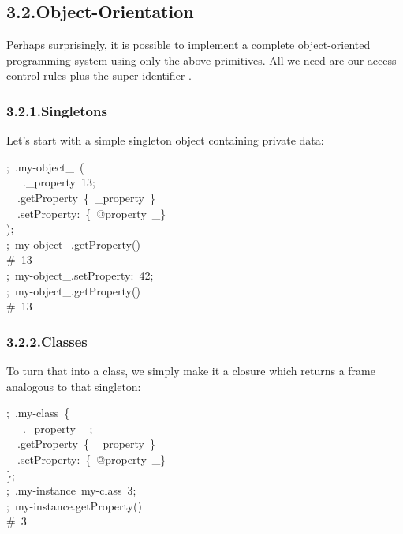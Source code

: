 \documentclass[preprint]{{acmart}}
\begin{document}
\subsection{3.2.\hspace*{0.5em}Object-Orientation}\label{sec-object-orientation}%

\noindent{}Perhaps surprisingly, it is possible to implement a complete object-oriented
programming system using only the above primitives.  All we need
are our access control rules plus the super identifier \mdcode{\_\textasciicircum{}}.%

\subsubsection{3.2.1.\hspace*{0.5em}Singletons}\label{sec-singletons}%

\noindent{}Let's start with a simple singleton object containing private data:%
\begin{mdpre}%
\noindent;~.my-object\_~(\\
~~~.\_property~{13};\\
~~.getProperty~\{~\_property~\}\\
~~.setProperty{:}~\{~{@property}~\_\}\\
);\\
;~my-object\_.getProperty()\\
{\#~13}\\
;~my-object\_.setProperty{:}~{42};\\
;~my-object\_.getProperty()\\
{\#~13}%
\end{mdpre}
\subsubsection{3.2.2.\hspace*{0.5em}Classes}\label{sec-classes}%

\noindent{}To turn that into a class, we simply make it a closure which returns
a frame analogous to that singleton:%
\begin{mdpre}%
\noindent;~.my-{class}~\{\\
~~~.\_property~\_;\\
~~.getProperty~\{~\_property~\}\\
~~.setProperty{:}~\{~{@property}~\_\}\\
\};\\
;~.my-instance~my-{class}~3;\\
;~my-instance.getProperty()\\
{\#~3}%
\end{mdpre}
\end{document}
